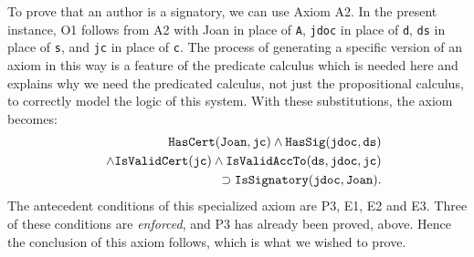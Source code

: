 To prove that an author is a signatory, we can use Axiom A2. In the present instance, O1 follows
from A2 with Joan in place of {\tt A}, {\tt jdoc} in place of {\tt d}, 
{\tt ds} in place of {\tt s}, and {\tt jc} in place of {\tt c}.
The process of generating a specific version of an axiom in this way
is a feature of the predicate calculus which is needed here and explains
why we need the predicated calculus, not just the propositional calculus,
to correctly model the logic of this system. With these substitutions,
the axiom becomes:
\begin{eqnarray}\label{A2specific}\nonumber
&&\hbox{\tt HasCert}({\tt Joan},{\tt jc}) \wedge \hbox{\tt HasSig}({\tt jdoc},{\tt ds}) \\ \nonumber
&&\wedge \hbox{\tt IsValidCert}({\tt jc}) 
\wedge {\tt IsValidAccTo}({\tt ds},{\tt jdoc},{\tt jc}) \\ \nonumber
&&\supset \hbox{\tt IsSignatory}({\tt jdoc},{\tt Joan}).
\end{eqnarray}
The antecedent conditions of this specialized axiom are
P3, E1, E2 and E3. Three of these conditions are {\em enforced}, and P3 has
already been proved, above. Hence the conclusion of this axiom follows, which
is what we wished to prove.


